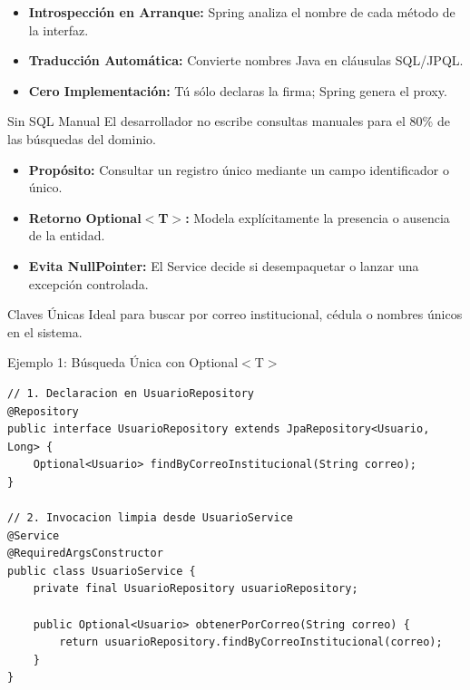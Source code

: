 \documentclass[aspectratio=169]{beamer}
\begin{document}
  {
    \begin{itemize}
      \item \textbf{Introspecci\'on en Arranque:} Spring analiza el nombre de cada m\'etodo de la interfaz.
      \item \textbf{Traducci\'on Autom\'atica:} Convierte nombres Java en cl\'ausulas SQL/JPQL.
      \item \textbf{Cero Implementaci\'on:} T\'u s\'olo declaras la firma; Spring genera el proxy.
    \end{itemize}
  }
  {Sin SQL Manual}
  {El desarrollador no escribe consultas manuales para el 80\% de las b\'usquedas del dominio.}

  {
    \begin{itemize}
      \item \textbf{Prop\'osito:} Consultar un registro \'unico mediante un campo identificador o \'unico.
      \item \textbf{Retorno Optional$<$T$>$:} Modela expl\'icitamente la presencia o ausencia de la entidad.
      \item \textbf{Evita NullPointer:} El Service decide si desempaquetar o lanzar una excepci\'on controlada.
    \end{itemize}
  }
  {Claves \'Unicas}
  {Ideal para buscar por correo institucional, c\'edula o nombres \'unicos en el sistema.}

\begin{frame}[fragile]{Ejemplo 1: B\'usqueda \'Unica con Optional$<$T$>$}
\begin{lstlisting}[style=SpringCodeStyle]
// 1. Declaracion en UsuarioRepository
@Repository
public interface UsuarioRepository extends JpaRepository<Usuario, Long> {
    Optional<Usuario> findByCorreoInstitucional(String correo);
}

// 2. Invocacion limpia desde UsuarioService
@Service
@RequiredArgsConstructor
public class UsuarioService {
    private final UsuarioRepository usuarioRepository;

    public Optional<Usuario> obtenerPorCorreo(String correo) {
        return usuarioRepository.findByCorreoInstitucional(correo);
    }
}
\end{lstlisting}
\end{frame}
\end{document}

